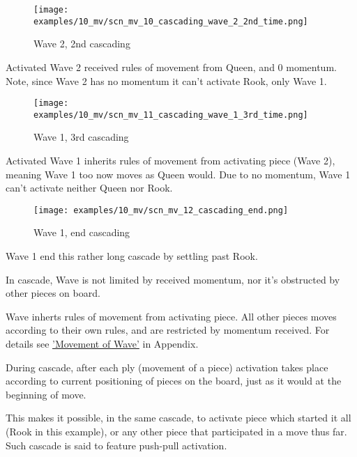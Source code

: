 \clearpage %

\noindent
\begin{wrapfigure}[7]{l}{0.5625\textwidth}
\centering
\texttt{[image: examples/10\_mv/scn\_mv\_10\_cascading\_wave\_2\_2nd\_time.png]}
\caption{Wave 2, 2nd cascading}
\label{fig:scn_mv_10_cascading_wave_2_2nd_time}
\end{wrapfigure}
Activated Wave 2 received rules of movement from Queen, and 0 momentum.
Note, since Wave 2 has no momentum it can't activate Rook, only Wave 1.

\vspace*{0.245\textheight}
\noindent
\begin{wrapfigure}[9]{r}{0.5625\textwidth}
\centering
\texttt{[image: examples/10\_mv/scn\_mv\_11\_cascading\_wave\_1\_3rd\_time.png]}
\caption{Wave 1, 3rd cascading}
\label{fig:scn_mv_11_cascading_wave_1_3rd_time}
\end{wrapfigure}
Activated Wave 1 inherits rules of movement from activating piece (Wave 2),
meaning Wave 1 too now moves as Queen would. Due to no momentum, Wave 1 can't
activate neither Queen nor Rook.

\clearpage %

\noindent
\begin{wrapfigure}[3]{l}{0.5625\textwidth}
\centering
\texttt{[image: examples/10\_mv/scn\_mv\_12\_cascading\_end.png]}
\caption{Wave 1, end cascading}
\label{fig:scn_mv_12_cascading_end}
\end{wrapfigure}
Wave 1 end this rather long cascade by settling past Rook.

\vspace*{0.345\textheight}
In cascade, Wave is not limited by received momentum, nor it's obstructed by
other pieces on board.

Wave inherts rules of movement from activating piece. All other pieces moves
according to their own rules, and are restricted by momentum received. For details
see \hyperref[sec:Appendix/Movement of Wave]{'Movement of Wave'} in Appendix.

During cascade, after each ply (movement of a piece) activation takes place
according to current positioning of pieces on the board, just as it would
at the beginning of move.

This makes it possible, in the same cascade, to activate piece which started
it all (Rook in this example), or any other piece that participated in a move
thus far. Such cascade is said to feature push-pull activation.

